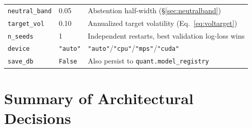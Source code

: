 \documentclass[11pt]{article}
\newcommand{\code}[1]{\texttt{\small #1}}
\begin{document}
\begin{center}
\begin{longtable}{@{}p{3.4cm}p{2.0cm}p{9.4cm}@{}}
\code{neutral\_band} & 0.05 & Abstention half-width (\S\ref{sec:neutralband}) \\
\code{target\_vol} & 0.10 & Annualized target volatility (Eq.~\ref{eq:voltarget}) \\
\code{n\_seeds} & 1 & Independent restarts, best validation log-loss wins \\
\code{device} & \code{"auto"} & \code{"auto"}/\code{"cpu"}/\code{"mps"}/\code{"cuda"} \\
\code{save\_db} & \code{False} & Also persist to \code{quant.model\_registry} \\
\bottomrule
\end{longtable}
\end{center}

\section{Summary of Architectural Decisions}
\label{sec:summary}
\end{document}
